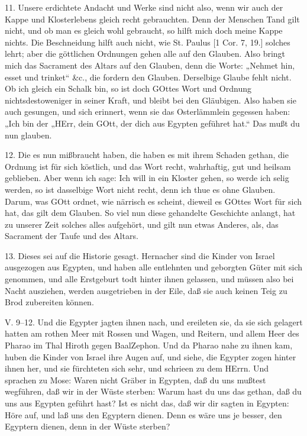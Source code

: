 11. Unsere erdichtete Andacht und Werke sind nicht also, wenn wir auch der Kappe und Klosterlebens gleich recht gebrauchten. Denn der Menschen Tand gilt nicht, und ob man es gleich wohl gebraucht, so hilft mich doch meine Kappe nichts. Die Beschneidung hilft auch nicht, wie St. Paulus [1 Cor. 7, 19.] solches lehrt; aber die göttlichen Ordnungen gehen alle auf den Glauben. Also bringt mich das Sacrament des Altars auf den Glauben, denn die Worte: „Nehmet hin, esset und trinket“ \&c., die fordern den Glauben. Derselbige Glaube fehlt nicht. Ob ich gleich ein Schalk bin, so ist doch GOttes Wort und Ordnung nichtsdestoweniger in seiner Kraft, und bleibt bei den Gläubigen. Also haben sie auch gesungen, und sich erinnert, wenn sie das Osterlämmlein gegessen haben: „Ich bin der
„HErr, dein GOtt, der dich aus Egypten geführet hat.“ Das mußt du nun glauben.

12. Die es nun mißbraucht haben, die haben es mit ihrem Schaden gethan, die Ordnung ist für sich köstlich, und das Wort recht, wahrhaftig, gut und heilsam geblieben. Aber wenn ich sage: Ich will in ein Kloster gehen, so werde ich selig werden, so ist dasselbige Wort nicht recht, denn ich thue es ohne Glauben. Darum, was GOtt ordnet, wie närrisch es scheint, dieweil es GOttes Wort für sich hat, das gilt dem Glauben. So viel nun diese gehandelte Geschichte anlangt, hat zu unserer Zeit solches alles aufgehört, und gilt nun etwas Anderes, als, das Sacrament der Taufe und des Altars.

13. Dieses sei auf die Historie gesagt. Hernacher sind die Kinder von Israel ausgezogen aus Egypten, und haben alle entlehnten und geborgten Güter mit sich genommen, und alle Erstgeburt todt hinter ihnen gelassen, und müssen also bei Nacht ausziehen, werden ausgetrieben in der Eile, daß sie auch keinen Teig zu Brod zubereiten können.

\begin{schriftzitat}
V. 9–12. Und die Egypter jagten ihnen nach, und ereileten sie, da sie sich gelagert hatten am rothen Meer mit Rossen und Wagen, und Reitern, und allem Heer des Pharao im Thal Hiroth gegen BaalZephon. Und da Pharao nahe zu ihnen kam, huben die Kinder von Israel ihre Augen auf, und siehe, die Egypter zogen hinter ihnen her, und sie fürchteten sich sehr, und schrieen zu dem HErrn. Und sprachen zu Mose: Waren nicht Gräber in Egypten, daß du uns mußtest wegführen, daß wir in der Wüste sterben: Warum hast du uns das gethan, daß du uns aus Egypten geführt hast? Ist es nicht das, daß wir dir sagten in Egypten: Höre auf, und laß uns den Egyptern dienen. Denn es wäre uns je besser, den Egyptern dienen, denn in der Wüste sterben?
\end{schriftzitat}

